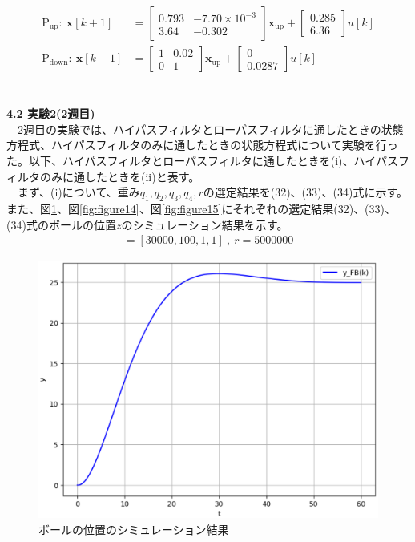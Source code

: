 \documentclass[a4paper,10.5pt]{ltjsarticle}
\begin{document}
\begin{align}
  \mathrm{P_{up}}:\ \bm x[k+1]&=
  \begin{bmatrix}
    0.793&-7.70\times 10^{-3}\\
    3.64&-0.302
  \end{bmatrix}\bm
  x_\mathrm{up}+
  \begin{bmatrix}
    0.285\\
    6.36
  \end{bmatrix}
  u[k]\\[10pt]
  \mathrm{P_{down}}:\ \bm x[k+1]&=
  \begin{bmatrix}
    1&0.02\\
    0&1
  \end{bmatrix}
  \bm x_\mathrm{up}+
  \begin{bmatrix}
    0\\
    0.0287
  \end{bmatrix}
  u[k]
\end{align}\\
\\
{\large \bfseries 4.2 実験2(2週目)}\\
　2週目の実験では、ハイパスフィルタとローパスフィルタに通したときの状態方程式、ハイパスフィルタのみに通したときの状態方程式について実験を行った。以下、ハイパスフィルタとローパスフィルタに通したときを(i)、ハイパスフィルタのみに通したときを(ii)と表す。\\
　まず、(i)について、重み$q_1,q_2,q_3,q_4,r$の選定結果を(32)、(33)、(34)式に示す。また、図\ref{fig:figure13}、図\ref{fig:figure14}、図\ref{fig:figure15}にそれぞれの選定結果(32)、(33)、(34)式のボールの位置$z$のシミュレーション結果を示す。
\begin{align}
  [q_1,q_2,q_3,q_4]=[30000,100,1,1]\ ,\ r=5000000
\end{align}
\begin{figure}[h]
  \centering
  \vspace{-30pt}\includegraphics[scale=0.5]{figure13.eps}
  \caption{ボールの位置のシミュレーション結果}
  \label{fig:figure13}
\end{figure}
\end{document}
